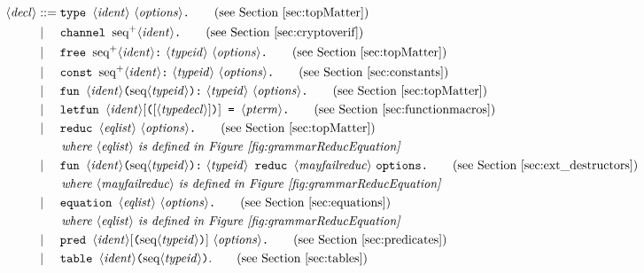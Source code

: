 \documentclass{book}
\newcommand{\nonterm}[1]{\langle\mathit{#1}\rangle}
\newcommand{\seq}[1]{\textrm{seq}\nonterm{#1}}
\newcommand{\neseq}[1]{\textrm{seq}^+\nonterm{#1}}
\begin{document}
\begin{figure}
\begin{align*}
\nonterm{decl} &::=
	\texttt{type } \nonterm{ident}\ \nonterm{options}\texttt{.}\tag{see Section~\ref{sec:topMatter}}\\
&\mid\phantom{:=}
        \texttt{channel } \neseq{ident}\texttt{.}\tag{see Section~\ref{sec:cryptoverif}}\\
&\mid\phantom{:=}
        \texttt{free } \neseq{ident} \texttt{:}\ \nonterm{typeid} \ \nonterm{options}\texttt{.}\tag{see Section~\ref{sec:topMatter}}\\
&\mid\phantom{:=}
        \texttt{const } \neseq{ident} \texttt{:}\ \nonterm{typeid}\ \nonterm{options}\texttt{.}\tag{see Section~\ref{sec:constants}}\\
&\mid\phantom{:=}
        \texttt{fun } \nonterm{ident}\texttt{(}\seq{typeid}\texttt{):}\ \nonterm{typeid}\ \nonterm{options}\texttt{.}\tag{see Section~\ref{sec:topMatter}}\\
&\mid\phantom{:=}
        \texttt{letfun } \nonterm{ident}[\texttt{(}[\nonterm{typedecl}]\texttt{)}]\texttt{ = }\nonterm{pterm}\texttt{.}\tag{see Section~\ref{sec:functionmacros}}\\
&\mid\phantom{:=}
        \texttt{reduc } \nonterm{eqlist}\ \nonterm{options}\texttt{.} \tag{see Section~\ref{sec:topMatter}}\\
		&\qquad\emph{where }\nonterm{eqlist}\emph{ is defined in Figure~\ref{fig:grammarReducEquation}}\\
&\mid\phantom{:=}
	\texttt{fun } \nonterm{ident}\texttt{(}\seq{typeid}\texttt{):}\ \nonterm{typeid}\texttt{ reduc } \nonterm{mayfailreduc}\ \texttt{options}\texttt{.} \tag{see Section~\ref{sec:ext_destructors}}\\
	&\qquad\emph{where }\nonterm{mayfailreduc}\emph{ is defined in Figure~\ref{fig:grammarReducEquation}}\\
%
&\mid\phantom{:=}
        \texttt{equation } \nonterm{eqlist}\ \nonterm{options}\texttt{.}\tag{see Section~\ref{sec:equations}}\\
	&\qquad\emph{where }\nonterm{eqlist}\emph{ is defined in Figure~\ref{fig:grammarReducEquation}}\\
&\mid\phantom{:=}
        \texttt{pred } \nonterm{ident}[\texttt{(}\seq{typeid}\texttt{)}] \ \nonterm{options}\texttt{.}\tag{see Section~\ref{sec:predicates}}\\
&\mid\phantom{:=}
        \texttt{table } \nonterm{ident}\texttt{(}\seq{typeid}\texttt{)}.\tag{see Section~\ref{sec:tables}}\\

\end{align*}
\end{figure}
\end{document}
